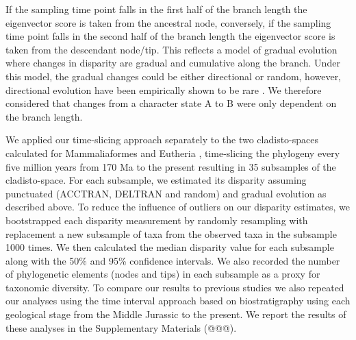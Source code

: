 \documentclass[12pt,letterpaper]{article}
\begin{document}
\begin{enumerate}
    If the sampling time point falls in the first half of the branch length the eigenvector score is taken from the ancestral node, conversely, if the sampling time point falls in the second half of the branch length the eigenvector score is taken from the descendant node/tip.
    This reflects a model of gradual evolution where changes in disparity are gradual and cumulative along the branch.
    Under this model, the gradual changes could be either directional or random, however, directional evolution have been empirically shown to be rare \citep[only 5\% of the time][]{Hunt20112007}.
    We therefore considered that changes from a character state A to B were only dependent on the branch length.
\end{enumerate}
We applied our time-slicing approach separately to the two cladisto-spaces calculated for Mammaliaformes \citep{Slater2012MEE} and Eutheria \citep{beckancient2014}, time-slicing the phylogeny every five million years from 170 Ma to the present resulting in 35 subsamples of the cladisto-space.
For each subsample, we estimated its disparity assuming punctuated (ACCTRAN, DELTRAN and random) and gradual evolution as described above.
To reduce the influence of outliers on our disparity estimates, we bootstrapped each disparity measurement by randomly resampling with replacement a new subsample of taxa from the observed taxa in the subsample 1000 times.
We then calculated the median disparity value for each subsample along with the 50\% and 95\% confidence intervals.
We also recorded the number of phylogenetic elements (nodes and tips) in each subsample as a proxy for taxonomic diversity.
To compare our results to previous studies we also repeated our analyses using the time interval approach based on biostratigraphy \citep[e.g.][]{cisneros2010,prentice2011,Hughes20082013,bentonmodels2014} using each geological stage from the Middle Jurassic to the present.
We report the results of these analyses in the Supplementary Materials (@@@). %

\end{document}
